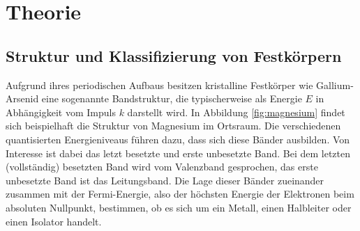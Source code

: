 \section{Theorie}
\label{sec:Theorie}

\subsection{Struktur und Klassifizierung von Festkörpern}
Aufgrund ihres periodischen Aufbaus besitzen kristalline Festkörper wie Gallium-Arsenid eine sogenannte Bandstruktur, die typischerweise als Energie $E$ in Abhängigkeit vom Impuls $k$ darstellt wird.
In Abbildung \ref{fig:magnesium}
findet sich beispielhaft die Struktur von Magnesium im Ortsraum. Die verschiedenen quantisierten Energieniveaus führen dazu, dass sich diese Bänder ausbilden. Von Interesse ist dabei das letzt besetzte und erste unbesetzte Band.
Bei dem letzten (vollständig) besetzten Band wird vom Valenzband gesprochen, das erste unbesetzte Band ist das Leitungsband. Die Lage dieser Bänder zueinander zusammen mit der Fermi-Energie, also der höchsten Energie der Elektronen
beim absoluten Nullpunkt, bestimmen, ob es sich um ein Metall, einen Halbleiter oder einen Isolator handelt.

